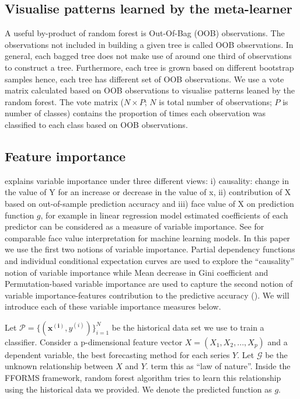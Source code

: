 \documentclass[11pt,a4paper,]{article}
\begin{document}
\hypertarget{visualise-patterns-learned-by-the-meta-learner}{%
\subsection{Visualise patterns learned by the meta-learner}\label{visualise-patterns-learned-by-the-meta-learner}}

A useful by-product of random forest is Out-Of-Bag (OOB) observations. The observations not included in building a given tree is called OOB observations. In general, each bagged tree does not make use of around one third of observations to construct a tree. Furthermore, each tree is grown based on different bootstrap samples hence, each tree has different set of OOB observations. We use a vote matrix calculated based on OOB observations to visualise patterns leaned by the random forest. The vote matrix (\(N \times P\); \(N\) is total number of observations; \(P\) is number of classes) contains the proportion of times each observation was classified to each class based on OOB observations.

\hypertarget{feature-importance}{%
\subsection{Feature importance}\label{feature-importance}}

\textcite{jiang2002} explains variable importance under three different views: i) causality: change in the value of Y for an increase or decrease in the value of x, ii) contribution of X based on out-of-sample prediction accuracy and iii) face value of X on prediction function \(g\), for example in linear regression model estimated coefficients of each predictor can be considered as a measure of variable importance. See \textcite{jiang2002} for comparable face value interpretation for machine learning models. In this paper we use the first two notions of variable importance. Partial dependency functions and individual conditional expectation curves are used to explore the ``causality'' notion of variable importance while Mean decrease in Gini coefficient and Permutation-based variable importance are used to capture the second notion of variable importance-features contribution to the predictive accuracy (\textcite{Zhao}). We will introduce each of these variable importance measures below.

Let \(\mathcal{P}=\{(\mathbf{x^{(i)}}, y^{(i)})\}_{i=1}^{N}\) be the
historical data set we use to train a classifier. Consider a
p-dimensional feature vector \(X=(X_1, X_2, ..., X_p)\) and a dependent
variable, the best forecasting method for each series \(Y\). Let \(\mathcal{G}\) be the unknown relationship between \(X\) and
\(Y\). \textcite{Zhao} term this as ``law of nature''. Inside the FFORMS framework, random forest algorithm tries to learn this relationship using
the historical data we provided. We denote the predicted function as
\(g\).
\end{document}
